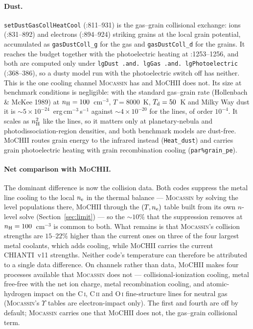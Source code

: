 \documentclass[english,a4paper]{my_memo}
\newcommand{\code}[1]{\texttt{#1}}
\newcommand{\MoCHII}{\textsc{MoCHII}}
\newcommand{\Mocassin}{\textsc{Mocassin}}
\newcommand{\OI}{O\,\textsc{i}}
\newcommand{\CI}{C\,\textsc{i}}
\newcommand{\CII}{C\,\textsc{ii}}
\newcommand{\nel}{n_{\rm e}}
\newcommand{\nH}{n_{\rm H}}
\begin{document}
\paragraph{Dust.}  \code{setDustGasCollHeatCool} (:811--931) is the gas--grain
collisional exchange: ions (:831--892) and electrons (:894--924) striking
grains at the local grain potential, accumulated as \code{gasDustColl\_g} for
the gas and \code{gasDustColl\_d} for the grains.  It reaches the budget
together with the photoelectric heating at :1253--1256, and both are computed
only under \code{lgDust .and. lgGas .and. lgPhotoelectric} (:368--386), so a
dusty model run with the photoelectric switch off has neither.  This is the one
cooling channel \Mocassin{} has and \MoCHII{} does not.  Its size at benchmark
conditions is negligible: with the standard gas--grain rate (Hollenbach \&
McKee 1989) at $\nH = 100$~cm$^{-3}$, $T = 8000$~K, $T_{\rm d} = 50$~K and
Milky Way dust it is $\sim5\times10^{-24}$~erg\,cm$^{-3}$\,s$^{-1}$ against
$\sim4\times10^{-20}$ for the lines, of order $10^{-4}$.  It scales as $\nH^2$
like the lines, so it matters only at planetary-nebula and
photodissociation-region densities, and both benchmark models are dust-free.
\MoCHII{} routes grain energy to the infrared instead (\code{Heat\_dust}) and
carries grain photoelectric heating with grain recombination cooling
(\code{par\%grain\_pe}).

\paragraph{Net comparison with \MoCHII{}.}  The dominant difference is now
the collision data.  Both codes suppress the metal line cooling to the local
$\nel$ in the thermal balance --- \Mocassin{} by solving the level populations
there, \MoCHII{} through the $(T, \nel)$ table built from its own $n$-level
solve (Section~\ref{sec:limit}) --- so the $\sim$$10\%$ that the suppression
removes at $\nH = 100$~cm$^{-3}$ is common to both.  What remains is that
\Mocassin{}'s collision strengths are $15$--$22\%$ higher than the current ones
on three of the four largest metal coolants, which adds cooling, while
\MoCHII{} carries the current CHIANTI~v11 strengths.  Neither code's temperature
can therefore be attributed to a single data difference.  On channels rather
than data, \MoCHII{} makes four processes available that \Mocassin{} does not ---
collisional-ionization cooling, metal free-free with the net ion charge, metal
recombination cooling, and atomic-hydrogen impact on the \CI{}, \CII{} and \OI{} fine-structure lines
for neutral gas (\Mocassin{}'s $\Upsilon$ tables are electron-impact only).
The first and fourth are off by default; \Mocassin{}
carries one that \MoCHII{} does not, the gas--grain collisional term.
\end{document}
